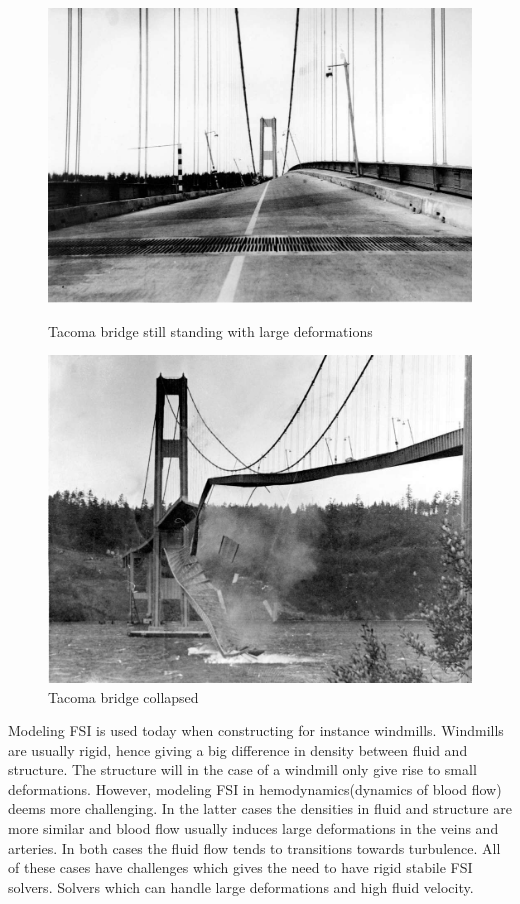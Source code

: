 \begin{figure}
\centering
\begin{minipage}{.51\textwidth}
  \centering
  \includegraphics[width=.95\linewidth]{./IntroductionToFSI/tacoma2.jpeg}
  \caption{Tacoma bridge still standing with large deformations}
  \label{fig:test1}
\end{minipage}%
\begin{minipage}{.50\textwidth}
  \centering
  \includegraphics[width=.95\linewidth]{./IntroductionToFSI/tacoma3.jpeg}
  \caption{Tacoma bridge collapsed}
  \label{fig:test2}
\end{minipage}
\end{figure}

Modeling FSI is used today when constructing for instance windmills. Windmills are usually rigid, hence giving a big difference in density between fluid and structure. The structure will in the case of a windmill only give rise to small deformations. However, modeling FSI in hemodynamics(dynamics of blood flow) deems more challenging. In the latter cases the densities in fluid and structure are more similar and blood flow usually induces large deformations in the veins and arteries. In both cases the fluid flow tends to transitions towards turbulence. All of these cases have challenges which gives the need to have rigid stabile FSI solvers. Solvers which can handle large deformations and high fluid velocity. \newline


